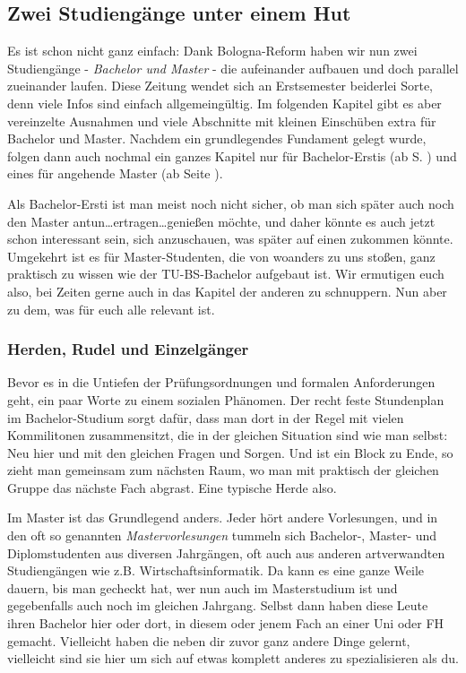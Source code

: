 \begin{multicols}{2}
\subsection{Zwei Studiengänge unter einem Hut}
	Es ist schon nicht ganz einfach: Dank Bologna-Reform haben wir nun zwei Studiengänge - \textit{Bachelor und Master} - die aufeinander aufbauen und doch parallel zueinander laufen. Diese Zeitung wendet sich an Erstsemester beiderlei Sorte, denn viele Infos sind einfach allgemeingültig. Im folgenden Kapitel gibt es aber vereinzelte Ausnahmen und viele Abschnitte mit kleinen Einschüben extra für Bachelor und Master. Nachdem ein grundlegendes Fundament gelegt wurde, folgen dann auch nochmal ein ganzes Kapitel nur für Bachelor-Erstis (ab S. \pageref{bachelor}) und eines für angehende Master (ab Seite \pageref{master}).

	Als Bachelor-Ersti ist man meist noch nicht sicher, ob man sich später auch noch den Master antun\ldots ertragen\ldots genießen möchte, und daher könnte es auch jetzt schon interessant sein, sich anzuschauen, was später auf einen zukommen könnte. Umgekehrt ist es für Master-Studenten, die von woanders zu uns stoßen, ganz praktisch zu wissen wie der TU-BS-Bachelor aufgebaut ist. Wir ermutigen euch also, bei Zeiten gerne auch in das Kapitel der anderen zu schnuppern. Nun aber zu dem, was für euch alle relevant ist.

\subsubsection{Herden, Rudel und Einzelgänger}
	Bevor es in die Untiefen der Prüfungsordnungen und formalen Anforderungen geht, ein paar Worte zu einem sozialen Phänomen. Der recht feste Stundenplan im Bachelor-Studium sorgt dafür, dass man dort in der Regel mit vielen Kommilitonen zusammensitzt, die in der gleichen Situation sind wie man selbst: Neu hier und mit den gleichen Fragen und Sorgen. Und ist ein Block zu Ende, so zieht man gemeinsam zum nächsten Raum, wo man mit praktisch der gleichen Gruppe das nächste Fach abgrast. Eine typische Herde also.

	Im Master ist das Grundlegend anders. Jeder hört andere Vorlesungen, und in den oft so genannten \emph{Mastervorlesungen} tummeln sich Bachelor-, Master- und Diplomstudenten aus diversen Jahrgängen, oft auch aus anderen artverwandten Studiengängen wie z.B. Wirtschaftsinformatik. Da kann es eine ganze Weile dauern, bis man gecheckt hat, wer nun auch im Masterstudium ist und gegebenfalls auch noch im gleichen Jahrgang. Selbst dann haben diese Leute ihren Bachelor hier oder dort, in diesem oder jenem Fach an einer Uni oder FH gemacht. Vielleicht haben die neben dir zuvor ganz andere Dinge gelernt, vielleicht sind sie hier um sich auf etwas komplett anderes zu spezialisieren als du.


\end{multicols}

